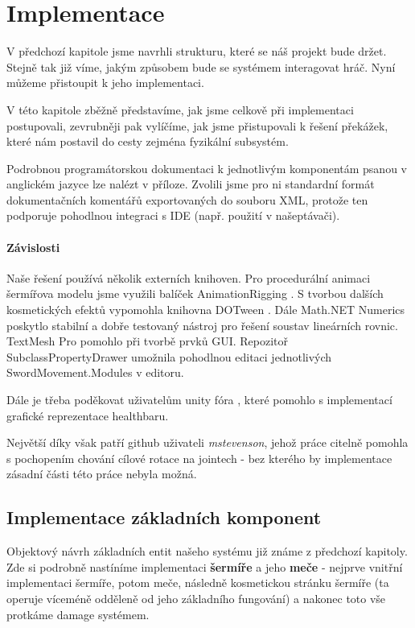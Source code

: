 \chapter{Implementace}

V předchozí kapitole jsme navrhli strukturu, které se náš projekt bude držet. Stejně tak již víme, jakým způsobem bude se systémem interagovat hráč. Nyní můžeme přistoupit k jeho implementaci.

V této kapitole zběžně představíme, jak jsme celkově při implementaci postupovali, zevrubněji pak vylíčíme, jak jsme přistupovali k řešení překážek, které nám postavil do cesty zejména fyzikální subsystém. 

Podrobnou programátorskou dokumentaci k jednotlivým komponentám psanou v anglickém jazyce lze nalézt v příloze. Zvolili jsme pro ni standardní formát dokumentačních komentářů exportovaných do souboru XML, protože ten podporuje pohodlnou integraci s IDE (např. použití v našeptávači).

\subsubsection*{Závislosti}
Naše řešení používá několik externích knihoven. Pro procedurální animaci šermířova modelu jsme využili balíček AnimationRigging \cite{AnimationRigging}. S tvorbou dalších kosmetických efektů vypomohla knihovna DOTween \cite{DoTween}. Dále Math.NET Numerics \cite{MathDotNetNumerics} poskytlo stabilní a dobře testovaný nástroj pro řešení soustav lineárních rovnic. TextMesh Pro \cite{TextMeshPro} pomohlo při tvorbě prvků GUI. Repozitoř SubclassPropertyDrawer \cite{SubclassPropertyDrawer} umožnila pohodlnou editaci jednotlivých SwordMovement.Modules v editoru. 

Dále je třeba poděkovat uživatelům unity fóra \cite{InvertReverseUIMask}, které pomohlo s implementací grafické reprezentace healthbaru.

Největší díky však patří github uživateli \textit{mstevenson}, jehož práce \cite{ConfigurableJointExtensions} citelně pomohla s pochopením chování cílové rotace na jointech - bez kterého by implementace zásadní části této práce nebyla možná.


\section{Implementace základních komponent}

Objektový návrh základních entit našeho systému již známe z předchozí kapitoly. Zde si podrobně nastíníme implementaci \textbf{šermíře} a jeho \textbf{meče} - nejprve vnitřní implementaci šermíře, potom meče, následně kosmetickou stránku šermíře (ta operuje víceméně odděleně od jeho základního fungování) a nakonec toto vše protkáme damage systémem. 


